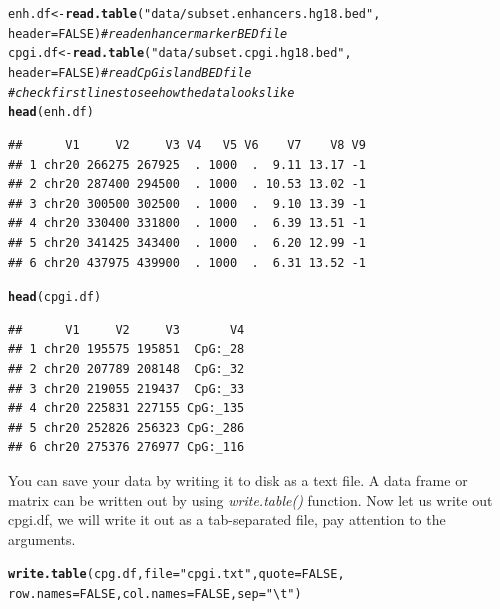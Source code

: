 \documentclass[english,nohyper]{tufte-book}\usepackage[]{graphicx}\usepackage[]{color}
\makeatletter
\newcommand{\hlnum}[1]{\textcolor[rgb]{0.686,0.059,0.569}{#1}}%
\newcommand{\hlstr}[1]{\textcolor[rgb]{0.192,0.494,0.8}{#1}}%
\newcommand{\hlcom}[1]{\textcolor[rgb]{0.678,0.584,0.686}{\textit{#1}}}%
\newcommand{\hlstd}[1]{\textcolor[rgb]{0.345,0.345,0.345}{#1}}%
\newcommand{\hlkwb}[1]{\textcolor[rgb]{0.69,0.353,0.396}{#1}}%
\newcommand{\hlkwc}[1]{\textcolor[rgb]{0.333,0.667,0.333}{#1}}%
\newcommand{\hlkwd}[1]{\textcolor[rgb]{0.737,0.353,0.396}{\textbf{#1}}}%
\newenvironment{kframe}{%
 \def\at@end@of@kframe{}%
 \ifinner\ifhmode%
  \def\at@end@of@kframe{\end{minipage}}%
  \begin{minipage}{\columnwidth}%
 \fi\fi%
 \def\FrameCommand##1{\hskip\@totalleftmargin \hskip-\fboxsep
 \colorbox{shadecolor}{##1}\hskip-\fboxsep
     \hskip-\linewidth \hskip-\@totalleftmargin \hskip\columnwidth}%
 \MakeFramed {\advance\hsize-\width
   \@totalleftmargin\z@ \linewidth\hsize
   \@setminipage}}%
 {\par\unskip\endMakeFramed%
 \at@end@of@kframe}
\newenvironment{knitrout}{}{} %
\makeatother
\begin{document}
\begin{knitrout}
\color{fgcolor}\begin{kframe}
\begin{alltt}
\hlstd{enh.df} \hlkwb{<-} \hlkwd{read.table}\hlstd{(}\hlstr{"data/subset.enhancers.hg18.bed"}\hlstd{,}
    \hlkwc{header} \hlstd{=} \hlnum{FALSE}\hlstd{)}  \hlcom{# read enhancer marker BED file}
\hlstd{cpgi.df} \hlkwb{<-} \hlkwd{read.table}\hlstd{(}\hlstr{"data/subset.cpgi.hg18.bed"}\hlstd{,}
    \hlkwc{header} \hlstd{=} \hlnum{FALSE}\hlstd{)}  \hlcom{# read CpG island BED file}
\hlcom{# check first lines to see how the data looks like}
\hlkwd{head}\hlstd{(enh.df)}
\end{alltt}
\begin{verbatim}
##      V1     V2     V3 V4   V5 V6    V7    V8 V9
## 1 chr20 266275 267925  . 1000  .  9.11 13.17 -1
## 2 chr20 287400 294500  . 1000  . 10.53 13.02 -1
## 3 chr20 300500 302500  . 1000  .  9.10 13.39 -1
## 4 chr20 330400 331800  . 1000  .  6.39 13.51 -1
## 5 chr20 341425 343400  . 1000  .  6.20 12.99 -1
## 6 chr20 437975 439900  . 1000  .  6.31 13.52 -1
\end{verbatim}
\begin{alltt}
\hlkwd{head}\hlstd{(cpgi.df)}
\end{alltt}
\begin{verbatim}
##      V1     V2     V3       V4
## 1 chr20 195575 195851  CpG:_28
## 2 chr20 207789 208148  CpG:_32
## 3 chr20 219055 219437  CpG:_33
## 4 chr20 225831 227155 CpG:_135
## 5 chr20 252826 256323 CpG:_286
## 6 chr20 275376 276977 CpG:_116
\end{verbatim}
\end{kframe}
\end{knitrout}


You can save your data by writing it to disk as a text file. A data
frame or matrix can be written out by using \emph{write.table()} function.
Now let us write out cpgi.df, we will write it out as a tab-separated
file, pay attention to the arguments.

\begin{knitrout}
\color{fgcolor}\begin{kframe}
\begin{alltt}
\hlkwd{write.table}\hlstd{(cpg.df,} \hlkwc{file} \hlstd{=} \hlstr{"cpgi.txt"}\hlstd{,} \hlkwc{quote} \hlstd{=} \hlnum{FALSE}\hlstd{,}
    \hlkwc{row.names} \hlstd{=} \hlnum{FALSE}\hlstd{,} \hlkwc{col.names} \hlstd{=} \hlnum{FALSE}\hlstd{,} \hlkwc{sep} \hlstd{=} \hlstr{"\textbackslash{}t"}\hlstd{)}
\end{alltt}
\end{kframe}
\end{knitrout}
\end{document}
